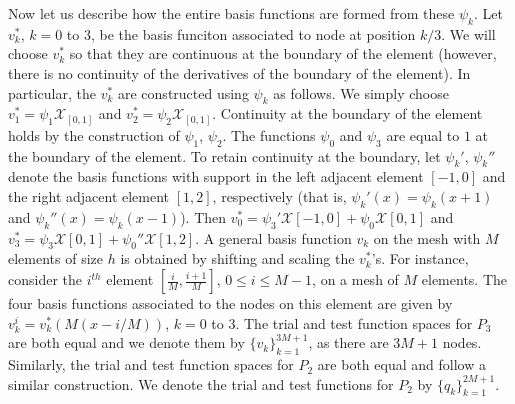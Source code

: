 \documentclass[11pt,letterpaper]{amsart}
\theoremstyle{plain}
\theoremstyle{definition}
\theoremstyle{remark}
\renewcommand{\leq}{\leqslant}
\begin{document}
    Now let us describe how the entire basis functions are formed from these $\psi_k$.
    Let $v_k^*$, $k = 0$ to $3$, be the basis funciton associated to node at position $k/3$. 
    We will choose $v_k^*$ so that they are continuous at the boundary of the element 
    (however, there is no continuity of the derivatives of the boundary of the element).
    In particular, the $v_k^*$ are constructed using $\psi_k$ as follows. 
    We simply choose $v_1^* = \psi_1 \mathcal{X}_{[0,1]}$ and $v_2^* = \psi_2 \mathcal{X}_{[0,1]}$. 
    Continuity at the boundary of the element holds by the construction of $\psi_1$, $\psi_2$. 
    The functions $\psi_0$ and $\psi_3$ are equal to $1$ at the boundary of the element.  To retain 
    continuity at the boundary, let $\psi_k'$, $\psi_k''$ denote the basis functions with support
    in the left adjacent element $[-1,0]$ and the right adjacent element $[1,2]$, respectively 
    (that is, $\psi_k'(x) = \psi_k(x+1)$ and $\psi_k''(x) = \psi_k(x-1)$). 
    Then $v_0^* = \psi_3' \mathcal{X}{[-1,0]} + \psi_0 \mathcal{X}{[0,1]}$ and $v_3^* = \psi_3 \mathcal{X}{[0,1]} + \psi_0'' \mathcal{X}{[1,2]}$.  
    A general basis function $v_k$ on the mesh with $M$ elements of size $h$ is obtained by shifting and scaling the $v_k^*$'s. 
    For instance, consider the $i^{th}$ element $[\frac{i}{M}, \frac{i+1}{M}]$, $0 \leq i \leq M-1$, on a mesh of $M$ elements. 
    The four basis functions associated to the nodes on this element are given by $v_k^i = v_k^*(M(x - i/M))$, $k = 0$ to $3$. 
    The trial and test function spaces for $P_3$ are both equal and we denote them by $\{ v_k \}_{k=1}^{3M+1}$, as there are $3M+1$ nodes. 
    Similarly, the trial and test function spaces for $P_2$ are both equal and follow a similar construction.  
    We denote the trial and test functions for $P_2$ by $\{ q_k \}_{k=1}^{2M+1}$.
    
\end{document}
